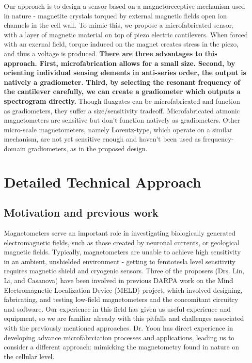 Our approach is to design a sensor based on a magnetoreceptive mechanism used in nature - magnetite crystals torqued by external magnetic fields open ion channels in the cell wall. To mimic this, we propose a microfabricated sensor, with a layer of magnetic material on top of piezo electric cantilevers. When forced with an exernal field, torque induced on the magnet creates stress in the piezo, and thus a voltage is produced. \textbf{There are three advantages to this approach. First, microfabrication allows for a small size. Second, by orienting individual sensing elements in anti-series order, the output is natively a gradiometer. Third, by selecting the resonant frequency of the cantilever carefully, we can create a gradiometer which outputs a spectrogram directly.} Though fluxgates can be microfabricated and function as gradiometers, they suffer a size/sensitivity tradeoff. Microfabricated atmonic magnetometers are sensitive but don't function natively as gradiometers. Other micro-scale magnetometers, namely Lorentz-type, which operate on a similar mechanism, are not yet sensitive enough and haven't been used as frequency-domain gradiometers, as in the proposed design.

\section{Detailed Technical Approach}

\subsection{Motivation and previous work}

Magnetometers serve an important role in investigating biologically generated electromagnetic fields, such as those created by neuronal currents, or geological magnetic fields. Typically, magnetometers are unable to achieve high sensitivity in an ambient, unshielded environment - getting to femtotesla level sensitivity requires magnetic shield and cryogenic sensors. Three of the proposers (Drs. Lin, Li, and Casanova) have been involved in previous DARPA work on the Mind Electromagnetic Localization Device (MELD) project, which involved designing, fabricating, and testing low-field magnetometers and the concomitant circuitry and software. Our experience in this field has given us useful experience and equipment, so we are familiar already with this pitfalls and challenges associated with the previously mentioned approaches. Dr. Yoon has direct experience in developing advance microfabrciation processes and applications\cite{yoon2003reduced,yoon2006multidirectional}, leading us to consider a different approach: mimicking the magnetometry found in nature on the cellular level.

